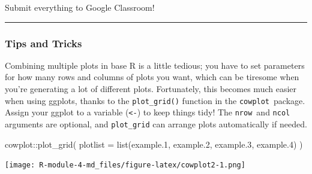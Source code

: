 \documentclass[
]{article}
\newenvironment{Shaded}{\begin{snugshade}}{\end{snugshade}}
\newcommand{\AttributeTok}[1]{\textcolor[rgb]{0.77,0.63,0.00}{#1}}
\newcommand{\FloatTok}[1]{\textcolor[rgb]{0.00,0.00,0.81}{#1}}
\newcommand{\FunctionTok}[1]{\textcolor[rgb]{0.00,0.00,0.00}{#1}}
\newcommand{\NormalTok}[1]{#1}
\newcommand{\SpecialCharTok}[1]{\textcolor[rgb]{0.00,0.00,0.00}{#1}}
\begin{document}
Submit everything to Google Classroom!

\begin{center}\rule{0.5\linewidth}{0.5pt}\end{center}

\pagebreak

\hypertarget{tips-and-tricks}{%
\subsubsection{Tips and Tricks}\label{tips-and-tricks}}

Combining multiple plots in base R is a little tedious; you have to set
parameters for how many rows and columns of plots you want, which can be
tiresome when you're generating a lot of different plots. Fortunately,
this becomes much easier when using ggplots, thanks to the
\texttt{plot\_grid()} function in the \texttt{cowplot}~package. Assign
your ggplot to a variable (\texttt{\textless{}-}) to keep things tidy!
The \texttt{nrow}~and \texttt{ncol} arguments are optional, and
\texttt{plot\_grid} can arrange plots automatically if needed.

\begin{Shaded}
\begin{Highlighting}[]
\NormalTok{cowplot}\SpecialCharTok{::}\FunctionTok{plot\_grid}\NormalTok{(}
  \AttributeTok{plotlist =} \FunctionTok{list}\NormalTok{(example}\FloatTok{.1}\NormalTok{, example}\FloatTok{.2}\NormalTok{, example}\FloatTok{.3}\NormalTok{, example}\FloatTok{.4}\NormalTok{)}
\NormalTok{  )}
\end{Highlighting}
\end{Shaded}

\texttt{[image: R-module-4-md\_files/figure-latex/cowplot2-1.png]}
\end{document}

